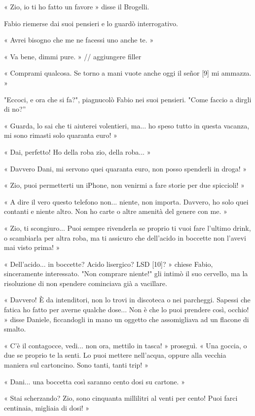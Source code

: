 « Zio, io ti ho fatto un favore » disse il Brogelli.

Fabio riemerse dai suoi pensieri e lo guardò interrogativo.

« Avrei bisogno che me ne facessi uno anche te. »

« Va bene, dimmi pure. » // aggiungere filler

« Comprami qualcosa. Se torno a mani vuote anche oggi il señor [9] mi ammazza. »

"Eccoci, e ora che si fa?", piagnucolò Fabio nei suoi pensieri. "Come faccio a dirgli di no?''

« Guarda, lo sai che ti aiuterei volentieri, ma... ho speso tutto in questa vacanza, mi sono rimasti solo quaranta euro! »

« Dai, perfetto! Ho della roba zio, della roba... »

« Davvero Dani, mi servono quei quaranta euro, non posso spenderli in droga! »

« Zio, puoi permetterti un iPhone, non venirmi a fare storie per due spiccioli! »

« A dire il vero questo telefono non... niente, non importa. Davvero, ho solo quei contanti e niente altro. Non ho carte o altre amenità del genere con me. »

« Zio, ti scongiuro... Puoi sempre rivenderla se proprio ti vuoi fare l'ultimo drink, o scambiarla per altra roba, ma ti assicuro che dell'acido in boccette non l'avevi mai visto prima! »

« Dell'acido... in boccette? Acido lisergico? LSD [10]? » chiese Fabio, sinceramente interessato. "Non comprare niente!" gli intimò il suo cervello, ma la risoluzione di non spendere cominciava già a vacillare.

« Davvero! È da intenditori, non lo trovi in discoteca o nei parcheggi. Sapessi che fatica ho fatto per averne qualche dose... Non è che lo puoi prendere così, occhio! » disse Daniele, ficcandogli in mano un oggetto che assomigliava ad un flacone di smalto.

« C'è il contagocce, vedi... non ora, mettilo in tasca! » proseguì. « Una goccia, o due se proprio te la senti. Lo puoi mettere nell'acqua, oppure alla vecchia maniera sul cartoncino. Sono tanti, tanti trip! »

« Dani... una boccetta così saranno cento dosi su cartone. »

« Stai scherzando? Zio, sono cinquanta millilitri al venti per cento! Puoi farci centinaia, migliaia di dosi! »

